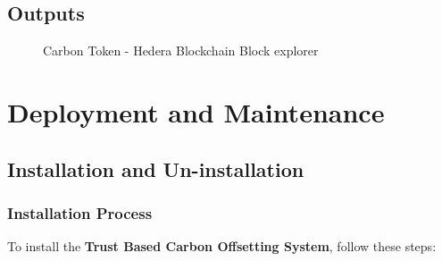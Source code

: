 \documentclass[oneside,a4paper,12pt]{book}
\begin{document}
\newpage
\section{Outputs}

\begin{center}
    \begin{figure}[!htbp]
        \centering
        \caption{Carbon Token - Hedera Blockchain Block explorer}
    \end{figure}
\end{center}

\chapter{Deployment and Maintenance}

\section{Installation and Un-installation}

\subsection{Installation Process}
To install the \textbf{Trust Based Carbon Offsetting System}, follow these steps:
\end{document}
